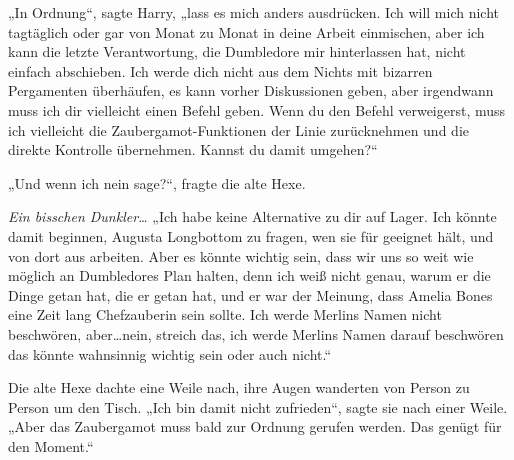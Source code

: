 „In Ordnung“, sagte Harry, „lass es mich anders ausdrücken. Ich will mich nicht tagtäglich oder gar von Monat zu Monat in deine Arbeit einmischen, aber ich kann die letzte Verantwortung, die Dumbledore mir hinterlassen hat, nicht einfach abschieben. Ich werde dich nicht aus dem Nichts mit bizarren Pergamenten überhäufen, es kann vorher Diskussionen geben, aber irgendwann muss ich dir vielleicht einen Befehl geben. Wenn du den Befehl verweigerst, muss ich vielleicht die Zaubergamot-Funktionen der Linie zurücknehmen und die direkte Kontrolle übernehmen. Kannst du damit umgehen?“

„Und wenn ich nein sage?“, fragte die alte Hexe.

\emph{Ein bisschen Dunkler…}
„Ich habe keine Alternative zu dir auf Lager. Ich könnte damit beginnen, Augusta Longbottom zu fragen, wen sie für geeignet hält, und von dort aus arbeiten. Aber es könnte wichtig sein, dass wir uns so weit wie möglich an Dumbledores Plan halten, denn ich weiß nicht genau, warum er die Dinge getan hat, die er getan hat, und er war der Meinung, dass Amelia Bones eine Zeit lang Chefzauberin sein sollte. Ich werde Merlins Namen nicht beschwören, aber…nein, streich das, ich werde Merlins Namen darauf beschwören das könnte wahnsinnig wichtig sein oder auch nicht.“

Die alte Hexe dachte eine Weile nach, ihre Augen wanderten von Person zu Person um den Tisch. „Ich bin damit nicht zufrieden“, sagte sie nach einer Weile.
„Aber das Zaubergamot muss bald zur Ordnung gerufen werden. Das genügt für den Moment.“

